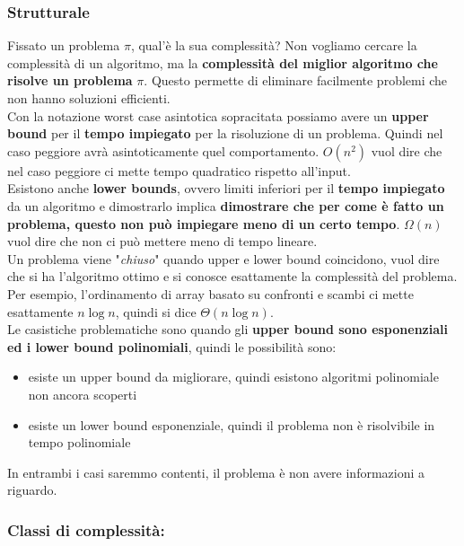\newpage

\subsubsection{Strutturale}

Fissato un problema $\pi$, qual'è la sua complessità? Non vogliamo cercare la complessità di un algoritmo, ma la \textbf{complessità del miglior algoritmo che risolve un problema} $\pi$. Questo permette di eliminare facilmente problemi che non hanno soluzioni efficienti.\\

Con la notazione worst case asintotica sopracitata possiamo avere un \textbf{upper bound} per il \textbf{tempo impiegato} per la risoluzione di un problema. Quindi nel caso peggiore avrà asintoticamente quel comportamento. $O(n^2)$ vuol dire che nel caso peggiore ci mette tempo quadratico rispetto all'input.\\

Esistono anche \textbf{lower bounds}, ovvero limiti inferiori per il \textbf{tempo impiegato} da un algoritmo e dimostrarlo implica \textbf{dimostrare che per come è fatto un problema, questo non può impiegare meno di un certo tempo}. $\Omega(n)$ vuol dire che non ci può mettere meno di tempo lineare.\\

Un problema viene "\textit{chiuso}" quando upper e lower bound coincidono, vuol dire che si ha l'algoritmo ottimo e si conosce esattamente la complessità del problema. Per esempio, l'ordinamento di array basato su confronti e scambi ci mette esattamente $n \log n$, quindi si dice $\Theta(n \log n)$.\\

Le casistiche problematiche sono quando gli \textbf{upper bound sono esponenziali ed i lower bound polinomiali}, quindi le possibilità sono: 
\begin{itemize}
	\item esiste un upper bound da migliorare, quindi esistono algoritmi polinomiale non ancora scoperti
	\item esiste un lower bound esponenziale, quindi il problema non è risolvibile in tempo polinomiale
\end{itemize}

In entrambi i casi saremmo contenti, il problema è non avere informazioni a riguardo.\\

\newpage

\subsubsection{Classi di complessità:} 

